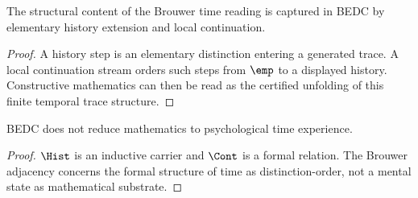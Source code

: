 \begin{theorem}
\label{thm:philosophy-brouwer-structural-claim-hist-time}
The structural content of the Brouwer time reading is captured in BEDC
by elementary history extension and local continuation.
\end{theorem}
\begin{proof}
A history step is an elementary distinction entering a generated trace.
A local continuation stream orders such steps from \(\emp\) to a
displayed history. Constructive mathematics can then be read as the
certified unfolding of this finite temporal trace structure.
\end{proof}

\begin{corollary}
\label{cor:philosophy-bedc-constructivism-not-psychologism}
BEDC does not reduce mathematics to psychological time experience.
\end{corollary}
\begin{proof}
\(\Hist\) is an inductive carrier and \(\Cont\) is a formal relation.
The Brouwer adjacency concerns the formal structure of time as
distinction-order, not a mental state as mathematical substrate.
\end{proof}
